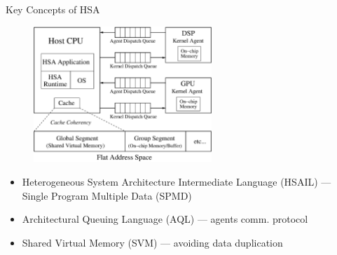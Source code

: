 \documentclass{beamer}
\begin{document}
\begin{CJK}{UTF8}{bkai}
            \begin{frame}{Key Concepts of HSA}
                \vspace{-1em}
                \begin{figure}[!ht]
                    \centering
                    \includegraphics[width=0.6\textwidth]{./figs/systemspec.eps}
                    \label{fig:systemspec}
                \end{figure}
                \vspace{-1em}
                \begin{itemize}
                    \pause
                    \item Heterogeneous System Architecture Intermediate Language (HSAIL) --- Single Program Multiple Data (SPMD) 
                    \pause
                    \item Architectural Queuing Language (AQL) --- agents comm. protocol
                    \pause
                    \item Shared Virtual Memory (SVM) --- avoiding data duplication
                \end{itemize}
            \end{frame}


\end{CJK}
\end{document}
